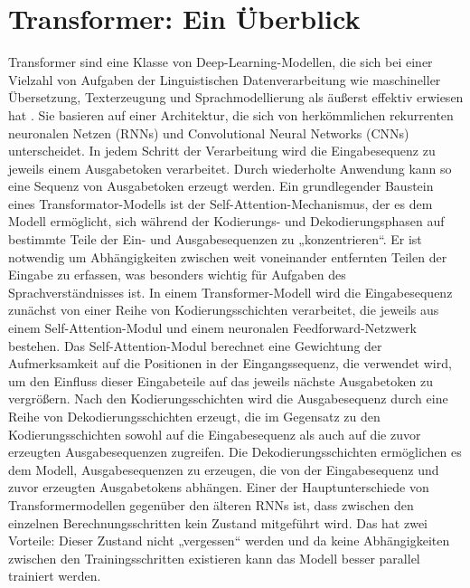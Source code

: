 \section{Transformer: Ein Überblick}
\label{subsec:Foundations:Transformer}
Transformer \cite{transformers} sind eine Klasse von Deep-Learning-Modellen, die sich bei einer Vielzahl von Aufgaben der Linguistischen Datenverarbeitung wie maschineller Übersetzung, Texterzeugung und Sprachmodellierung als äußerst effektiv erwiesen hat \cite{transformers,bert,FewShotLearners,gpt4}.
Sie basieren auf einer Architektur, die sich von herkömmlichen rekurrenten neuronalen Netzen (RNNs) und Convolutional Neural Networks (CNNs) unterscheidet.
In jedem Schritt der Verarbeitung wird die Eingabesequenz zu jeweils einem Ausgabetoken verarbeitet.
Durch wiederholte Anwendung kann so eine Sequenz von Ausgabetoken erzeugt werden.
Ein grundlegender Baustein eines Transformator-Modells ist der Self-Attention-Mechanismus, der es dem Modell ermöglicht, sich während der Kodierungs- und Dekodierungsphasen auf bestimmte Teile der Ein- und Ausgabesequenzen zu „konzentrieren“.
Er ist notwendig um Abhängigkeiten zwischen weit voneinander entfernten Teilen der Eingabe zu erfassen, was besonders wichtig für Aufgaben des Sprachverständnisses ist.
In einem Transformer-Modell wird die Eingabesequenz zunächst von einer Reihe von Kodierungsschichten verarbeitet, die jeweils aus einem Self-Attention-Modul und einem neuronalen Feedforward-Netzwerk bestehen.
Das Self-Attention-Modul berechnet eine Gewichtung der Aufmerksamkeit auf die Positionen in der Eingangssequenz, die verwendet wird, um den Einfluss dieser Eingabeteile auf das jeweils nächste Ausgabetoken zu vergrößern.
Nach den Kodierungsschichten wird die Ausgabesequenz durch eine Reihe von Dekodierungsschichten erzeugt, die im Gegensatz zu den Kodierungsschichten sowohl auf die Eingabesequenz als auch auf die zuvor erzeugten Ausgabesequenzen zugreifen.
Die Dekodierungsschichten ermöglichen es dem Modell, Ausgabesequenzen zu erzeugen, die von der Eingabesequenz und zuvor erzeugten Ausgabetokens abhängen.
Einer der Hauptunterschiede von Transformermodellen gegenüber den älteren RNNs ist, dass zwischen den einzelnen Berechnungsschritten kein Zustand mitgeführt wird.
Das hat zwei Vorteile: Dieser Zustand nicht „vergessen“ werden und da keine Abhängigkeiten zwischen den Trainingsschritten existieren kann das Modell besser parallel trainiert werden.

